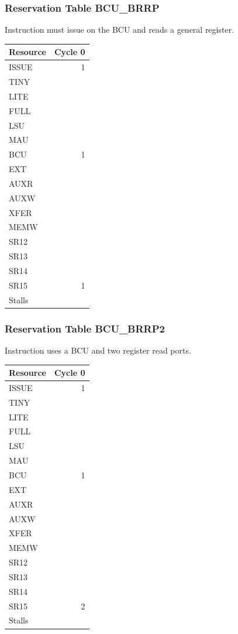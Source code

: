 \subsubsection{Reservation Table BCU\_BRRP} \label{sec:reservation-BCU-BRRP}

Instruction must issue on the BCU and reads a general register.
\medskip

\begin{tabular}{|l|r|} \hline
Resource	& Cycle 0 \\ \hline
\textsf{ISSUE}	& 1	\\
\textsf{TINY}	& 	\\
\textsf{LITE}	& 	\\
\textsf{FULL}	& 	\\
\textsf{LSU}	& 	\\
\textsf{MAU}	& 	\\
\textsf{BCU}	& 1	\\
\textsf{EXT}	& 	\\
\textsf{AUXR}	& 	\\
\textsf{AUXW}	& 	\\
\textsf{XFER}	& 	\\
\textsf{MEMW}	& 	\\
\textsf{SR12}	& 	\\
\textsf{SR13}	& 	\\
\textsf{SR14}	& 	\\
\textsf{SR15}	& 1	\\
\hline Stalls	& 	\\
\hline \end{tabular}

\subsubsection{Reservation Table BCU\_BRRP2} \label{sec:reservation-BCU-BRRP2}

Instruction uses a BCU and two register read ports.
\medskip

\begin{tabular}{|l|r|} \hline
Resource	& Cycle 0 \\ \hline
\textsf{ISSUE}	& 1	\\
\textsf{TINY}	& 	\\
\textsf{LITE}	& 	\\
\textsf{FULL}	& 	\\
\textsf{LSU}	& 	\\
\textsf{MAU}	& 	\\
\textsf{BCU}	& 1	\\
\textsf{EXT}	& 	\\
\textsf{AUXR}	& 	\\
\textsf{AUXW}	& 	\\
\textsf{XFER}	& 	\\
\textsf{MEMW}	& 	\\
\textsf{SR12}	& 	\\
\textsf{SR13}	& 	\\
\textsf{SR14}	& 	\\
\textsf{SR15}	& 2	\\
\hline Stalls	& 	\\
\hline \end{tabular}

